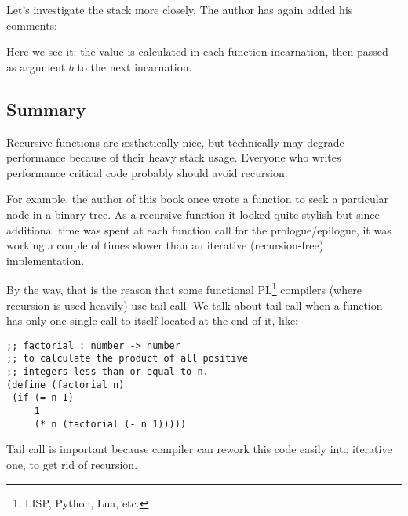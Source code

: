 Let's investigate the stack more closely. The author has again added his comments:



Here we see it: the  value is calculated in each function incarnation, then passed as
argument $b$ to the next incarnation.

\subsection{Summary}

\label{Recursion_and_tail_call}
\myindex{\Recursion}
Recursive functions are \ae{}sthetically nice, but technically may degrade performance because
of their heavy stack usage.
Everyone who writes performance critical code probably should avoid recursion.

For example, the author of this book once wrote a function to seek a particular node in a binary tree. 
As a recursive function it looked quite stylish but since additional time
was spent at each function call
for the prologue/epilogue, it was working a couple of times slower than an iterative (recursion-free)
implementation.

\newcommand{\FnFP}{\footnote{LISP, Python, Lua, etc.}}

By the way, that is the reason that some functional \ac{PL}\FnFP{} compilers (where recursion is used heavily) use \gls{tail call}.
We talk about tail call when a function has only one single call to itself located at the end of it, like:

\begin{lstlisting}[caption=Scheme{,} example is copypasted from Wikipedia]
;; factorial : number -> number
;; to calculate the product of all positive
;; integers less than or equal to n.
(define (factorial n)
 (if (= n 1)
     1
	 (* n (factorial (- n 1)))))
\end{lstlisting}

Tail call is important because compiler can rework this code easily into iterative one, to get rid of recursion.

